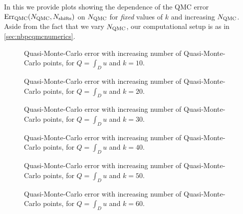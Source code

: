In this  we provide plots showing the dependence of the QMC error $\QMCerror{\NQMC}{\Nshifts}$ on $N_{\mathrm{QMC}}$ for \emph{fixed} values of $k$ and increasing $N_{\mathrm{QMC}}$. Aside from the fact that we vary $N_{\mathrm{QMC}}$, our computational setup is as in \cref{sec:nbpcqmcnumerics}.

\begin{figure}[h]
    \centering
    
    \caption[Quasi-Monte-Carlo error, for $Q=\int_D u$ and $k=10$.]{Quasi-Monte-Carlo error with increasing number of Quasi-Monte-Carlo points, for $Q=\int_D u$ and $k=10$. \label{fig:qmcintegral10}}
  \end{figure}
\begin{figure}[h]
  \centering

\caption[Quasi-Monte-Carlo error, for $Q=\int_D u$ and $k=20$.]{Quasi-Monte-Carlo error with increasing number of Quasi-Monte-Carlo points, for $Q=\int_D u$ and $k=20$. \label{fig:qmcintegral20}}
\end{figure}
\begin{figure}[h]
    \centering
    
    \caption[Quasi-Monte-Carlo error, for $Q=\int_D u$ and $k=30$.]{Quasi-Monte-Carlo error with increasing number of Quasi-Monte-Carlo points, for $Q=\int_D u$ and $k=30$. \label{fig:qmcintegral30}}
\end{figure}
\begin{figure}[h]
  \centering

\caption[Quasi-Monte-Carlo error, for $Q=\int_D u$ and $k=40$.]{Quasi-Monte-Carlo error with increasing number of Quasi-Monte-Carlo points, for $Q=\int_D u$ and $k=40$. \label{fig:qmcintegral40}}
\end{figure}
\begin{figure}[h]
    \centering
    
    \caption[Quasi-Monte-Carlo error, for $Q=\int_D u$ and $k=50$.]{Quasi-Monte-Carlo error with increasing number of Quasi-Monte-Carlo points, for $Q=\int_D u$ and $k=50$. \label{fig:qmcintegral50}}
  \end{figure}
\begin{figure}[h]
  \centering

\caption[Quasi-Monte-Carlo error, for $Q=\int_D u$ and $k=60$.]{Quasi-Monte-Carlo error with increasing number of Quasi-Monte-Carlo points, for $Q=\int_D u$ and $k=60$. \label{fig:qmcintegral60}}
\end{figure}


